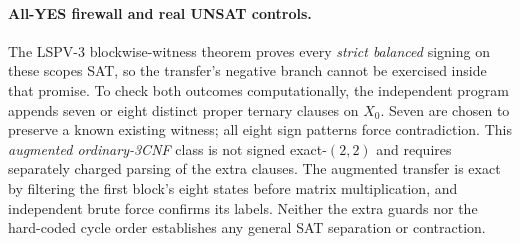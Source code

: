 \documentclass[11pt]{article}
\begin{document}
\paragraph{All-YES firewall and real UNSAT controls.}
The LSPV-3 blockwise-witness theorem proves every \emph{strict balanced} signing on these scopes SAT, so the transfer's negative branch cannot be exercised inside that promise. To check both outcomes computationally, the independent program appends seven or eight distinct proper ternary clauses on $X_0$. Seven are chosen to preserve a known existing witness; all eight sign patterns force contradiction. This \emph{augmented ordinary-3CNF} class is not signed exact-$(2,2)$ and requires separately charged parsing of the extra clauses. The augmented transfer is exact by filtering the first block's eight states before matrix multiplication, and independent brute force confirms its labels. Neither the extra guards nor the hard-coded cycle order establishes any general SAT separation or contraction.
\end{document}
